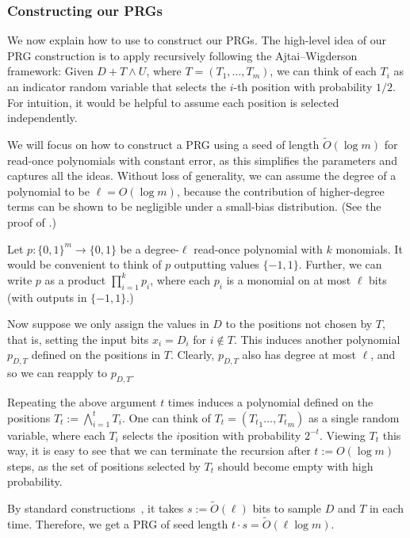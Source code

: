 \documentclass{toc}
\newcommand{\zo}{\{0,1\}}
\def\pmone{\{-1, 1\}}
\def\Blocklength{\ell}
\begin{document}
\subsubsection{Constructing our PRGs}  %
We now explain how to use  to construct our PRGs.
The high-level idea of our PRG construction is to apply  recursively following the Ajtai--Wigderson framework:
Given $D + T \wedge U$, where $T = (T_1, \ldots, T_m)$, we can think of each $T_i$ as an indicator random variable that selects the $i$-th position with probability $1/2$.
For intuition, it would be helpful to assume each position is selected independently.

We will focus on how to construct a PRG using a seed of length $\tilde O(\log m)$ for read-once polynomials with constant error, as this simplifies the parameters and captures all the ideas.
Without loss of generality, we can assume the degree of a polynomial to be $\Blocklength = O(\log m)$, because the contribution of higher-degree terms can be shown to be negligible under a small-bias distribution. (See the proof of .)

Let $p\colon \zo^m \to \zo$ be a degree-$\Blocklength$ read-once polynomial with $k$ monomials.
It would be convenient to think of $p$ outputting values $\pmone$.
Further, we can write $p$ as a product $\prod_{i=1}^k p_i$, where each $p_i$ is a monomial on at most $\Blocklength$ bits (with outputs in $\pmone$.)

Now suppose we only assign the values in $D$ to the positions not chosen by $T$, that is, setting the input bits $x_i = D_i$ for $i \not\in T$.
This induces another polynomial $p_{D,T}$ defined on the positions in $T$.
Clearly, $p_{D,T}$ also has degree at most $\Blocklength$, and so we can reapply  to $p_{D,T}$.

Repeating the above argument $t$ times induces a polynomial defined on the positions
%
$T_t := \bigwedge_{i=1}^t T_i$.
One can think of $T_t = ({T_t}_1 \ldots, {T_t}_m)$ as a single random variable, where each $T_i$ selects the $i$position with probability $2^{-t}$.
Viewing $T_t$ this way, it is easy to see that we can terminate the recursion after $t := O(\log m)$ steps, as the set of positions selected by $T_t$ should become empty with high probability.

By standard constructions~\cite{NaorN93}, it takes $s := \tilde O(\Blocklength)$ bits to sample $D$ and $T$ in  each time.
Therefore, we get a PRG of seed length $t \cdot s = \tilde O(\Blocklength \log m)$.
\end{document}
